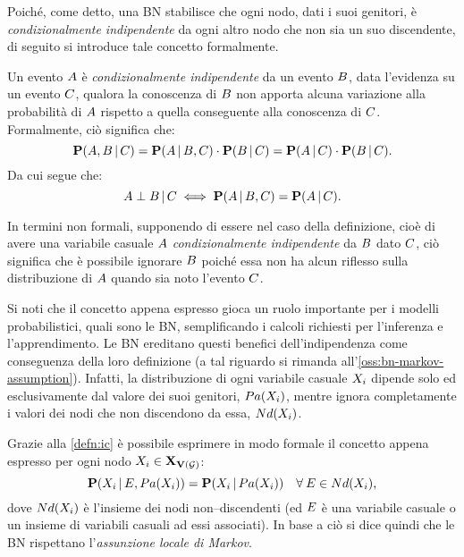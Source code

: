 Poiché, come detto, una \acl{BN} stabilisce che ogni nodo, dati i suoi genitori, è \emph{condizionalmente indipendente} da ogni altro nodo che non sia un suo discendente, di seguito si introduce tale concetto formalmente.
\begin{definizione}\label{defn:ic}
Un evento $\mathnormal{A}$ è \emph{condizionalmente indipendente} da un evento $\mathnormal{B}$, data l'evidenza su un evento $\mathnormal{C}$, qualora la conoscenza di $\mathnormal{B}$ non apporta alcuna variazione alla probabilità di $\mathnormal{A}$ rispetto a quella conseguente alla conoscenza di $\mathnormal{C}$.
Formalmente, ciò significa che:
\[
\mathbf{P}(\mathnormal{A},\mathnormal{B}\,\arrowvert\,\mathnormal{C})=\mathbf{P}(\mathnormal{A}\,\arrowvert\,\mathnormal{B},\mathnormal{C})\cdot\mathbf{P}(\mathnormal{B}\,\arrowvert\,\mathnormal{C})=\mathbf{P}(\mathnormal{A}\,\arrowvert\,\mathnormal{C})\cdot\mathbf{P}(\mathnormal{B}\,\arrowvert\,\mathnormal{C})\text{.}
\]
Da cui segue che:
\[
\mathnormal{A}\perp\mathnormal{B}\,\arrowvert\,\mathnormal{C}\iff\mathbf{P}(\mathnormal{A}\,\arrowvert\,\mathnormal{B},\mathnormal{C})=\mathbf{P}(\mathnormal{A}\,\arrowvert\,\mathnormal{C})\text{.}
\]
\end{definizione}
In termini non formali, supponendo di essere nel caso della definizione, cioè di avere una variabile casuale $\mathnormal{A}$ \emph{condizionalmente indipendente} da $\mathnormal{B}$ dato $\mathnormal{C}$, ciò significa che è possibile ignorare $\mathnormal{B}$ poiché essa non ha alcun riflesso sulla distribuzione \cond*{} di $\mathnormal{A}$ quando sia noto l'evento $\mathnormal{C}$.

Si noti che il concetto appena espresso gioca un ruolo importante per i modelli probabilistici, quali sono le \acl{BN}, semplificando i calcoli richiesti per l'inferenza e l'apprendimento. Le \acl{BN} ereditano questi benefici dell'indipendenza \cond*{} come conseguenza della loro definizione (a tal riguardo si rimanda all'\autoref{oss:bn-markov-assumption}). Infatti, la distribuzione \cond*{} di ogni variabile casuale $\mathnormal{X_i}$ dipende solo ed esclusivamente dal valore dei suoi genitori, $Pa(\mathnormal{X_i})$, mentre ignora completamente i valori dei nodi che non discendono da essa, $Nd(\mathnormal{X_i})$.

Grazie alla \autoref{defn:ic} è possibile esprimere in modo formale il concetto appena espresso per ogni nodo $\mathnormal{X_i}\in\mathbf{X}_{\mathbf{V}(\mathcal{G})}$:
\[
\mathbf{P}(\mathnormal{X_i}\,\arrowvert\,\mathnormal{E},Pa(\mathnormal{X_i}))=\mathbf{P}(\mathnormal{X_i}\,\arrowvert\,Pa(\mathnormal{X_i})) \quad \forall\:\mathnormal{E}\in Nd(\mathnormal{X_i})\text{,}
\]
dove $Nd(\mathnormal{X_i})$ è l'insieme dei nodi non--discendenti (ed $\mathnormal{E}$ è una variabile casuale o un insieme di variabili casuali ad essi associati).
In base a ciò si dice quindi che le \acl{BN} rispettano l'\emph{assunzione locale di Markov}.

